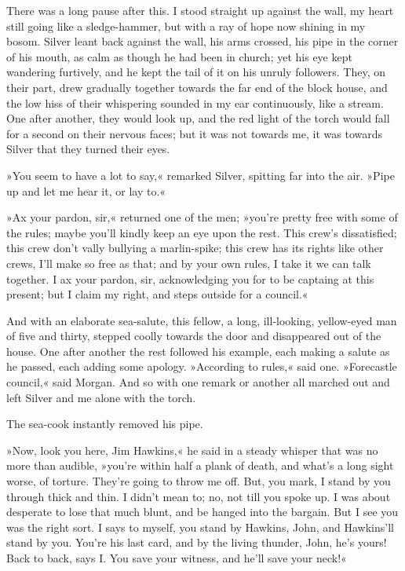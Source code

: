 There was a long pause after this. I stood straight up against the wall, my heart still going like a sledge-hammer, but with a ray of hope now shining in my bosom. Silver leant back against the wall, his arms crossed, his pipe in the corner of his mouth, as calm as though he had been in church; yet his eye kept wandering furtively, and he kept the tail of it on his unruly followers. They, on their part, drew gradually together towards the far end of the block house, and the low hiss of their whispering sounded in my ear continuously, like a stream. One after another, they would look up, and the red light of the torch would fall for a second on their nervous faces; but it was not towards me, it was towards Silver that they turned their eyes.

»You seem to have a lot to say,« remarked Silver, spitting far into the air. »Pipe up and let me hear it, or lay to.«

»Ax your pardon, sir,« returned one of the men; »you're pretty free with some of the rules; maybe you'll kindly keep an eye upon the rest. This crew's dissatisfied; this crew don't vally bullying a marlin-spike; this crew has its rights like other crews, I'll make so free as that; and by your own rules, I take it we can talk together. I ax your pardon, sir, acknowledging you for to be captaing at this present; but I claim my right, and steps outside for a council.«

And with an elaborate sea-salute, this fellow, a long, ill-looking, yellow-eyed man of five and thirty, stepped coolly towards the door and disappeared out of the house. One after another the rest followed his example, each making a salute as he passed, each adding some apology. »According to rules,« said one. »Forecastle council,« said Morgan. And so with one remark or another all marched out and left Silver and me alone with the torch.

The sea-cook instantly removed his pipe.

»Now, look you here, Jim Hawkins,« he said in a steady whisper that was no more than audible, »you're within half a plank of death, and what's a long sight worse, of torture. They're going to throw me off. But, you mark, I stand by you through thick and thin. I didn't mean to; no, not till you spoke up. I was about desperate to lose that much blunt, and be hanged into the bargain. But I see you was the right sort. I says to myself, you stand by Hawkins, John, and Hawkins'll stand by you. You're his last card, and by the living thunder, John, he's yours! Back to back, says I. You save your witness, and he'll save your neck!«

